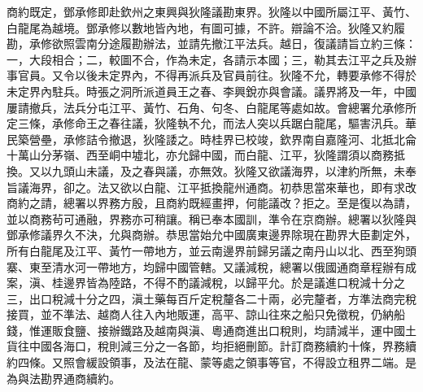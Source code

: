\begin{pinyinscope}
商約既定，鄧承修即赴欽州之東興與狄隆議勘東界。狄隆以中國所屬江平、黃竹、白龍尾為越境。鄧承修以數地皆內地，有圖可據，不許。辯論不洽。狄隆又約履勘，承修欲照雲南分途履勘辦法，並請先撤江平法兵。越日，復議請旨立約三條：一，大段相合；二，較圖不合，作為未定，各請示本國；三，勒其去江平之兵及辦事官員。又令以後未定界內，不得再派兵及官員前往。狄隆不允，轉要承修不得於未定界內駐兵。時張之洞所派道員王之春、李興銳亦與會議。議界將及一年，中國屢請撤兵，法兵分屯江平、黃竹、石角、句冬、白龍尾等處如故。會總署允承修所定三條，承修命王之春往議，狄隆執不允，而法人突以兵踞白龍尾，驅害汛兵。華民築營壘，承修詰令撤退，狄隆諉之。時桂界已校竣，欽界南自嘉隆河、北抵北侖十萬山分茅嶺、西至峒中墟北，亦允歸中國，而白龍、江平，狄隆謂須以商務抵換。又以九頭山未議，及之春與議，亦無效。狄隆又欲議海界，以津約所無，未奉旨議海界，卻之。法又欲以白龍、江平抵換龍州通商。初恭思當來華也，即有求改商約之請，總署以界務方殷，且商約既經畫押，何能議改？拒之。至是復以為請，並以商務茍可通融，界務亦可稍讓。稱已奉本國訓，準令在京商辦。總署以狄隆與鄧承修議界久不決，允與商辦。恭思當始允中國廣東邊界除現在勘界大臣劃定外，所有白龍尾及江平、黃竹一帶地方，並云南邊界前歸另議之南丹山以北、西至狗頭寨、東至清水河一帶地方，均歸中國管轄。又議減稅，總署以俄國通商章程辦有成案，滇、桂邊界皆為陸路，不得不酌議減稅，以歸平允。於是議進口稅減十分之三，出口稅減十分之四，滇土藥每百斤定稅釐各二十兩，必完釐者，方準法商完稅接買，並不準法、越商人往入內地販運，高平、諒山往來之船只免徵稅，仍納船錢，惟運販食鹽、接辦鐵路及越南與滇、粵通商進出口稅則，均請減半，運中國土貨往中國各海口，稅則減三分之一各節，均拒絕刪節。計訂商務續約十條，界務續約四條。又照會緩設領事，及法在龍、蒙等處之領事等官，不得設立租界二端。是為與法勘界通商續約。


\end{pinyinscope}
